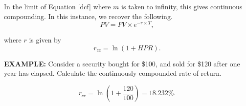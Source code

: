 \documentclass[../notes_compiled.tex]{subfiles}
\begin{document}
\begin{itemize}
\item[] In the limit of Equation \ref{dcf} where $m$ is taken to infinity, this gives continuous compounding. In this instance, we recover the following.
\begin{equation}
PV = FV \times e^{-r\times T},
\end{equation}
\item[] where $r$ is given by
\begin{equation}
r_{cc}=\ln(1+HPR).
\end{equation}
{\color{RedViolet}
\item[] \textbf{EXAMPLE:} Consider a security bought for \$100, and sold for \$120 after one year has elapsed. Calculate the continuously compounded rate of return.
}
{\color{RoyalBlue}
\begin{equation*}
r_{cc} = \ln\left(1+\frac{120}{100}\right) = 18.232\%.
\end{equation*}
}

\end{itemize}
\end{document}

